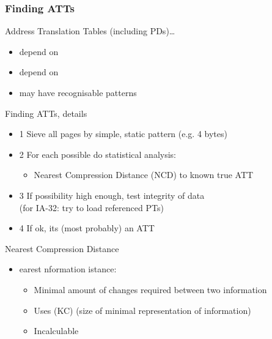 \documentclass{beamer}
\newenvironment{itemizeframe}[1]
  {\begin{frame}{#1}\startitemizeframe}
  {\stopitemizeframe\end{frame}}
\newcommand\startitemizeframe{\begin{itemize}}
\newcommand\stopitemizeframe{\end{itemize}}
\begin{document}
		\begin{frame} \frametitle{Finding ATTs}
			Address Translation Tables (including PDs)\ldots
			\begin{itemize}
				\item depend on 
				\item depend on 
				\item may have recognisable patterns
			\end{itemize}
		\end{frame}

		\begin{itemizeframe}{Finding ATTs, details}
			\item[1] Sieve all pages by simple, static pattern (e.g. 4 bytes)
			\item[2] For each possible do statistical analysis:
			\begin{itemize}
				\item Nearest Compression Distance (NCD) to known true ATT
			\end{itemize}
			\item[3] If possibility high enough, test integrity of data \\ (for IA-32: try to load referenced PTs)
			\item[4] If ok, its (most probably) an ATT
		\end{itemizeframe}

		\begin{itemizeframe}{Nearest Compression Distance}
			\item {}earest nformation istance:
			\begin{itemize}
				\item Minimal amount of changes required between two information
				\item Uses  (KC) (size of minimal representation of information)
				\item Incalculable
			\end{itemize}
		\end{itemizeframe}
\end{document}
